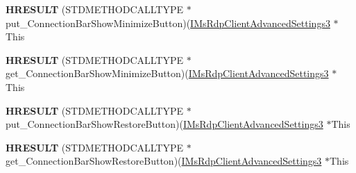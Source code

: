 \begin{DoxyCompactItemize}
{\bfseries H\+R\+E\+S\+U\+LT} (S\+T\+D\+M\+E\+T\+H\+O\+D\+C\+A\+L\+L\+T\+Y\+PE $\ast$put\+\_\+\+Connection\+Bar\+Show\+Minimize\+Button)(\hyperlink{interface_m_s_t_s_c_lib_1_1_i_ms_rdp_client_advanced_settings3}{I\+Ms\+Rdp\+Client\+Advanced\+Settings3} $\ast$This
\item 
\mbox{\label{struct_m_s_t_s_c_lib_1_1_i_ms_rdp_client_advanced_settings3_vtbl_a9ab0b66edac3e962577f9c61215291aa}} 
{\bfseries H\+R\+E\+S\+U\+LT} (S\+T\+D\+M\+E\+T\+H\+O\+D\+C\+A\+L\+L\+T\+Y\+PE $\ast$get\+\_\+\+Connection\+Bar\+Show\+Minimize\+Button)(\hyperlink{interface_m_s_t_s_c_lib_1_1_i_ms_rdp_client_advanced_settings3}{I\+Ms\+Rdp\+Client\+Advanced\+Settings3} $\ast$This
\item 
\mbox{\label{struct_m_s_t_s_c_lib_1_1_i_ms_rdp_client_advanced_settings3_vtbl_a1337845e39bc7153b34046229c811f86}} 
{\bfseries H\+R\+E\+S\+U\+LT} (S\+T\+D\+M\+E\+T\+H\+O\+D\+C\+A\+L\+L\+T\+Y\+PE $\ast$put\+\_\+\+Connection\+Bar\+Show\+Restore\+Button)(\hyperlink{interface_m_s_t_s_c_lib_1_1_i_ms_rdp_client_advanced_settings3}{I\+Ms\+Rdp\+Client\+Advanced\+Settings3} $\ast$This
\item 
\mbox{\label{struct_m_s_t_s_c_lib_1_1_i_ms_rdp_client_advanced_settings3_vtbl_a6955016646291c428a39e614882d2576}} 
{\bfseries H\+R\+E\+S\+U\+LT} (S\+T\+D\+M\+E\+T\+H\+O\+D\+C\+A\+L\+L\+T\+Y\+PE $\ast$get\+\_\+\+Connection\+Bar\+Show\+Restore\+Button)(\hyperlink{interface_m_s_t_s_c_lib_1_1_i_ms_rdp_client_advanced_settings3}{I\+Ms\+Rdp\+Client\+Advanced\+Settings3} $\ast$This
\end{DoxyCompactItemize}
